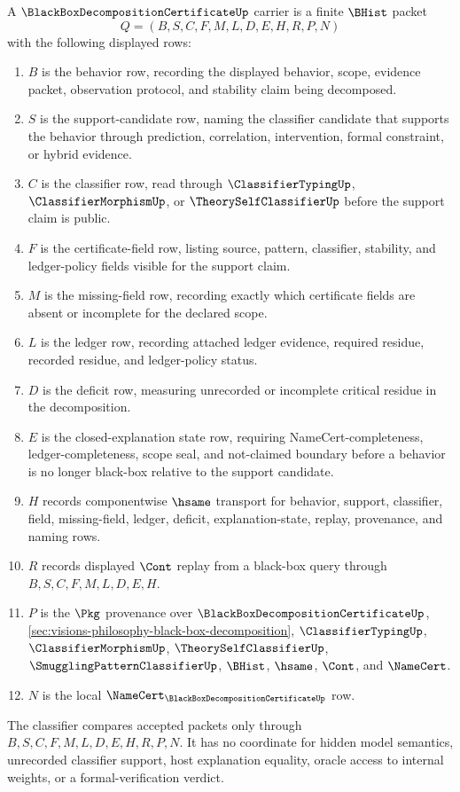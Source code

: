 \begin{definition}
\label{def:black-box-decomposition-certificate-carrier}
A $\BlackBoxDecompositionCertificateUp$ carrier is a finite $\BHist$ packet
$$
Q=(B,S,C,F,M,L,D,E,H,R,P,N)
$$
with the following displayed rows:
\begin{enumerate}
\item $B$ is the behavior row, recording the displayed behavior, scope, evidence packet, observation protocol, and stability claim being decomposed.
\item $S$ is the support-candidate row, naming the classifier candidate that supports the behavior through prediction, correlation, intervention, formal constraint, or hybrid evidence.
\item $C$ is the classifier row, read through $\ClassifierTypingUp$, $\ClassifierMorphismUp$, or $\TheorySelfClassifierUp$ before the support claim is public.
\item $F$ is the certificate-field row, listing source, pattern, classifier, stability, and ledger-policy fields visible for the support claim.
\item $M$ is the missing-field row, recording exactly which certificate fields are absent or incomplete for the declared scope.
\item $L$ is the ledger row, recording attached ledger evidence, required residue, recorded residue, and ledger-policy status.
\item $D$ is the deficit row, measuring unrecorded or incomplete critical residue in the decomposition.
\item $E$ is the closed-explanation state row, requiring NameCert-completeness, ledger-completeness, scope seal, and not-claimed boundary before a behavior is no longer black-box relative to the support candidate.
\item $H$ records componentwise $\hsame$ transport for behavior, support, classifier, field, missing-field, ledger, deficit, explanation-state, replay, provenance, and naming rows.
\item $R$ records displayed $\Cont$ replay from a black-box query through $B,S,C,F,M,L,D,E,H$.
\item $P$ is the $\Pkg$ provenance over $\BlackBoxDecompositionCertificateUp$, \autoref{sec:visions-philosophy-black-box-decomposition}, $\ClassifierTypingUp$, $\ClassifierMorphismUp$, $\TheorySelfClassifierUp$, $\SmugglingPatternClassifierUp$, $\BHist$, $\hsame$, $\Cont$, and $\NameCert$.
\item $N$ is the local $\NameCert_{\BlackBoxDecompositionCertificateUp}$ row.
\end{enumerate}
The classifier compares accepted packets only through $B,S,C,F,M,L,D,E,H,R,P,N$. It has no coordinate for hidden model semantics, unrecorded classifier support, host explanation equality, oracle access to internal weights, or a formal-verification verdict.
\end{definition}

